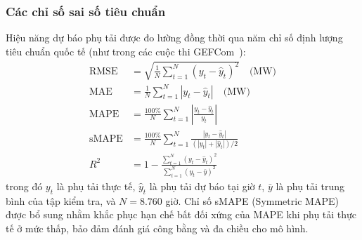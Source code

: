 \subsubsection{Các chỉ số sai số tiêu chuẩn}
Hiệu năng dự báo phụ tải được đo lường đồng thời qua năm chỉ số định lượng tiêu chuẩn quốc tế (như trong các cuộc thi GEFCom~\cite{hong2014global, hong2016probabilistic}):
\begin{align}
    \text{RMSE} &= \sqrt{\frac{1}{N}\sum_{t=1}^N (y_t - \hat{y}_t)^2} \quad \text{(MW)} \\
    \text{MAE} &= \frac{1}{N}\sum_{t=1}^N |y_t - \hat{y}_t| \quad \text{(MW)} \\
    \text{MAPE} &= \frac{100\%}{N}\sum_{t=1}^N \left|\frac{y_t - \hat{y}_t}{y_t}\right| \\
    \text{sMAPE} &= \frac{100\%}{N}\sum_{t=1}^N \frac{|y_t - \hat{y}_t|}{(|y_t| + |\hat{y}_t|)/2} \\
    R^2 &= 1 - \frac{\sum_{t=1}^N (y_t - \hat{y}_t)^2}{\sum_{t=1}^N (y_t - \bar{y})^2}
\end{align}
trong đó $y_t$ là phụ tải thực tế, $\hat{y}_t$ là phụ tải dự báo tại giờ $t$, $\bar{y}$ là phụ tải trung bình của tập kiểm tra, và $N = 8.760$ giờ. Chỉ số sMAPE (Symmetric MAPE) được bổ sung nhằm khắc phục hạn chế bất đối xứng của MAPE khi phụ tải thực tế ở mức thấp, bảo đảm đánh giá công bằng và đa chiều cho mô hình.


